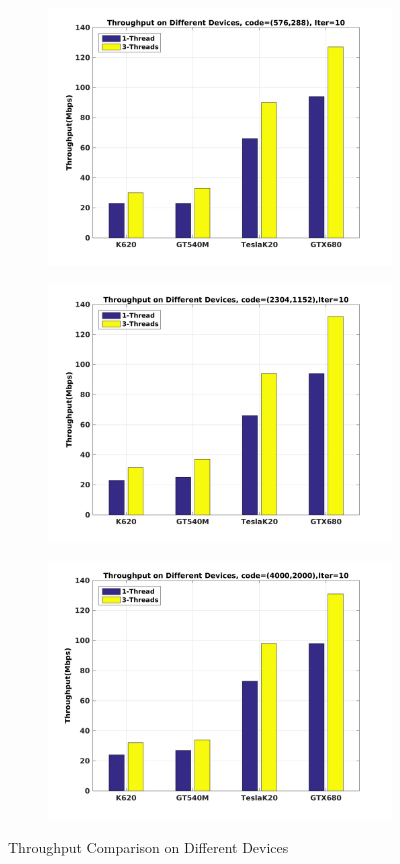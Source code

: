 \documentclass{article}
\begin{document}
\begin{figure}[H]
\begin{subfigure}{0.8\textwidth}
  \centering
  \includegraphics[width=.8\linewidth]{c_576_10.jpg}
  \label{fig:sfig10_1}
\end{subfigure}%
\begin{subfigure}{0.8\textwidth}
  \centering
  \includegraphics[width=.8\linewidth]{c_2304_10.jpg}
  \label{fig:sfig10_2}
\end{subfigure}
\begin{subfigure}{0.8\textwidth}
  \centering
  \includegraphics[width=.8\linewidth]{c_4k_10.jpg}
  \label{fig:sfig10_3}
\end{subfigure}
\caption{Throughput Comparison on Different Devices}
\label{fig:fig}
\end{figure}
\end{document}
